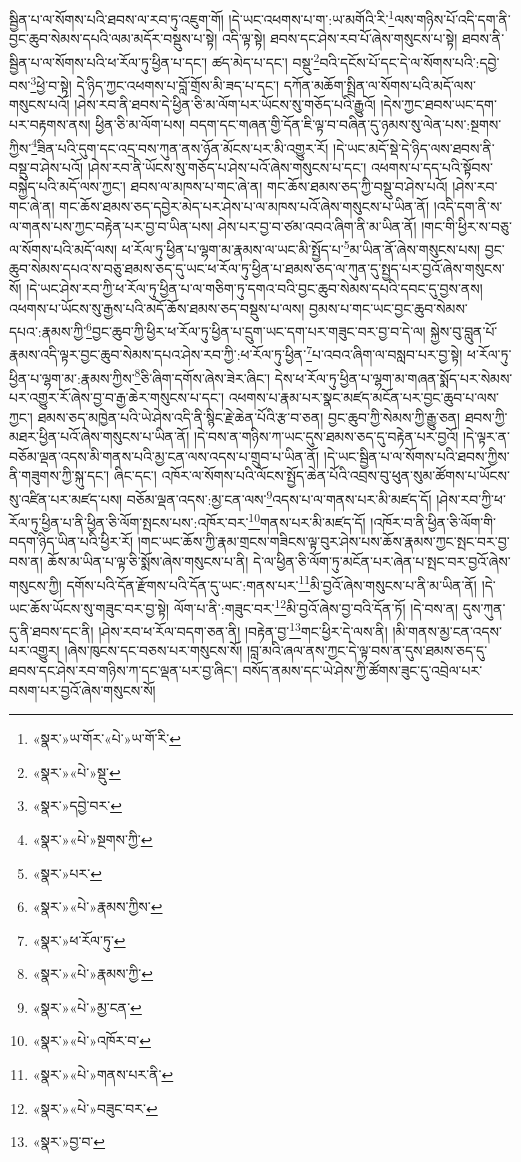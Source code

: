 སྦྱིན་པ་ལ་སོགས་པའི་ཐབས་ལ་རབ་ཏུ་འཇུག་གོ། །དེ་ཡང་འཕགས་པ་ག་:ཡ་མགོའི་རི་\footnote{«སྣར་»ཡ་གོར་«པེ་»ཡ་གོ་རི་}ལས་གཉིས་པོ་འདི་དག་ནི་བྱང་ཆུབ་སེམས་དཔའི་ལམ་མདོར་བསྡུས་པ་སྟེ། འདི་ལྟ་སྟེ། ཐབས་དང་ཤེས་རབ་པོ་ཞེས་གསུངས་པ་སྟེ། ཐབས་ནི་སྦྱིན་པ་ལ་སོགས་པའི་ཕ་རོལ་ཏུ་ཕྱིན་པ་དང་། ཚད་མེད་པ་དང་། བསྡུ་\footnote{«སྣར་»«པེ་»སྡུ་}བའི་དངོས་པོ་དང་དེ་ལ་སོགས་པའི་:དབྱེ་བས་\footnote{«སྣར་»དབྱེ་བར་}ཕྱེ་བ་སྟེ། དེ་ཉིད་ཀྱང་འཕགས་པ་བློ་གྲོས་མི་ཟད་པ་དང་། དཀོན་མཆོག་སྤྲིན་ལ་སོགས་པའི་མདོ་ལས་གསུངས་པའོ། །ཤེས་རབ་ནི་ཐབས་དེ་ཕྱིན་ཅི་མ་ལོག་པར་ཡོངས་སུ་གཅོད་པའི་རྒྱུའོ། །དེས་ཀྱང་ཐབས་ཡང་དག་པར་བརྟགས་ནས། ཕྱིན་ཅི་མ་ལོག་པས། བདག་དང་གཞན་གྱི་དོན་ཇི་ལྟ་བ་བཞིན་དུ་ཉམས་སུ་ལེན་པས་:སྔགས་ཀྱིས་\footnote{«སྣར་»«པེ་»སྔགས་ཀྱི་}ཟིན་པའི་དུག་དང་འདྲ་བས་ཀུན་ནས་ཉོན་མོངས་པར་མི་འགྱུར་རོ། །དེ་ཡང་མདོ་སྡེ་དེ་ཉིད་ལས་ཐབས་ནི་བསྡུ་བ་ཤེས་པའོ། །ཤེས་རབ་ནི་ཡོངས་སུ་གཅོད་པ་ཤེས་པའོ་ཞེས་གསུངས་པ་དང་། འཕགས་པ་དད་པའི་སྟོབས་བསྐྱེད་པའི་མདོ་ལས་ཀྱང་། ཐབས་ལ་མཁས་པ་གང་ཞེ་ན། གང་ཆོས་ཐམས་ཅད་ཀྱི་བསྡུ་བ་ཤེས་པའོ། །ཤེས་རབ་གང་ཞེ་ན། གང་ཆོས་ཐམས་ཅད་དབྱེར་མེད་པར་ཤེས་པ་ལ་མཁས་པའོ་ཞེས་གསུངས་པ་ཡིན་ནོ། །འདི་དག་ནི་ས་ལ་གནས་པས་ཀྱང་བརྟེན་པར་བྱ་བ་ཡིན་པས། ཤེས་པར་བྱ་བ་ཙམ་འབའ་ཞིག་ནི་མ་ཡིན་ནོ། །གང་གི་ཕྱིར་ས་བཅུ་ལ་སོགས་པའི་མདོ་ལས། ཕ་རོལ་ཏུ་ཕྱིན་པ་ལྷག་མ་རྣམས་ལ་ཡང་མི་སྤྱོད་པ་\footnote{«སྣར་»པར་}མ་ཡིན་ནོ་ཞེས་གསུངས་པས། བྱང་ཆུབ་སེམས་དཔའ་ས་བཅུ་ཐམས་ཅད་དུ་ཡང་ཕ་རོལ་ཏུ་ཕྱིན་པ་ཐམས་ཅད་ལ་ཀུན་དུ་སྤྱད་པར་བྱའོ་ཞེས་གསུངས་སོ། །དེ་ཡང་ཤེས་རབ་ཀྱི་ཕ་རོལ་ཏུ་ཕྱིན་པ་ལ་གཅིག་ཏུ་དགའ་བའི་བྱང་ཆུབ་སེམས་དཔའི་དབང་དུ་བྱས་ནས། འཕགས་པ་ཡོངས་སུ་རྒྱས་པའི་མདོ་ཆོས་ཐམས་ཅད་བསྡུས་པ་ལས། བྱམས་པ་གང་ཡང་བྱང་ཆུབ་སེམས་དཔའ་:རྣམས་ཀྱི་\footnote{«སྣར་»«པེ་»རྣམས་ཀྱིས་}བྱང་ཆུབ་ཀྱི་ཕྱིར་ཕ་རོལ་ཏུ་ཕྱིན་པ་དྲུག་ཡང་དག་པར་གཟུང་བར་བྱ་བ་དེ་ལ། སྐྱེས་བུ་བླུན་པོ་རྣམས་འདི་ལྟར་བྱང་ཆུབ་སེམས་དཔའ་ཤེས་རབ་ཀྱི་:ཕ་རོལ་ཏུ་ཕྱིན་\footnote{«སྣར་»ཕ་རོལ་ཏུ་}པ་འབའ་ཞིག་ལ་བསླབ་པར་བྱ་སྟེ། ཕ་རོལ་ཏུ་ཕྱིན་པ་ལྷག་མ་:རྣམས་ཀྱིས་\footnote{«སྣར་»«པེ་»རྣམས་ཀྱི་}ཅི་ཞིག་དགོས་ཞེས་ཟེར་ཞིང་། དེས་ཕ་རོལ་ཏུ་ཕྱིན་པ་ལྷག་མ་གཞན་སྨོད་པར་སེམས་པར་འགྱུར་རོ་ཞེས་བྱ་བ་རྒྱ་ཆེར་གསུངས་པ་དང་། འཕགས་པ་རྣམ་པར་སྣང་མཛད་མངོན་པར་བྱང་ཆུབ་པ་ལས་ཀྱང་། ཐམས་ཅད་མཁྱེན་པའི་ཡེ་ཤེས་འདི་ནི་སྙིང་རྗེ་ཆེན་པོའི་རྩ་བ་ཅན། བྱང་ཆུབ་ཀྱི་སེམས་ཀྱི་རྒྱུ་ཅན། ཐབས་ཀྱི་མཐར་ཕྱིན་པའོ་ཞེས་གསུངས་པ་ཡིན་ནོ། །དེ་བས་ན་གཉིས་ཀ་ཡང་དུས་ཐམས་ཅད་དུ་བརྟེན་པར་བྱའོ། །དེ་ལྟར་ན་བཅོམ་ལྡན་འདས་མི་གནས་པའི་མྱ་ངན་ལས་འདས་པ་གྲུབ་པ་ཡིན་ནོ། །དེ་ཡང་སྦྱིན་པ་ལ་སོགས་པའི་ཐབས་ཀྱིས་ནི་གཟུགས་ཀྱི་སྐུ་དང་། ཞིང་དང་། འཁོར་ལ་སོགས་པའི་ལོངས་སྤྱོད་ཆེན་པོའི་འབྲས་བུ་ཕུན་སུམ་ཚོགས་པ་ཡོངས་སུ་འཛིན་པར་མཛད་པས། བཅོམ་ལྡན་འདས་:མྱ་ངན་ལས་\footnote{«སྣར་»«པེ་»མྱ་ངན་}འདས་པ་ལ་གནས་པར་མི་མཛད་དོ། །ཤེས་རབ་ཀྱི་ཕ་རོལ་ཏུ་ཕྱིན་པ་ནི་ཕྱིན་ཅི་ལོག་སྤངས་པས་:འཁོར་བར་\footnote{«སྣར་»«པེ་»འཁོར་བ་}གནས་པར་མི་མཛད་དོ། །འཁོར་བ་ནི་ཕྱིན་ཅི་ལོག་གི་བདག་ཉིད་ཡིན་པའི་ཕྱིར་རོ། །གང་ཡང་ཆོས་ཀྱི་རྣམ་གྲངས་གཟིངས་ལྟ་བུར་ཤེས་པས་ཆོས་རྣམས་ཀྱང་སྤང་བར་བྱ་བས་ན། ཆོས་མ་ཡིན་པ་ལྟ་ཅི་སྨོས་ཞེས་གསུངས་པ་ནི། དེ་ལ་ཕྱིན་ཅི་ལོག་ཏུ་མངོན་པར་ཞེན་པ་སྤང་བར་བྱའོ་ཞེས་གསུངས་ཀྱི། དགོས་པའི་དོན་རྫོགས་པའི་དོན་དུ་ཡང་:གནས་པར་\footnote{«སྣར་»«པེ་»གནས་པར་ནི་}མི་བྱའོ་ཞེས་གསུངས་པ་ནི་མ་ཡིན་ནོ། །དེ་ཡང་ཆོས་ཡོངས་སུ་གཟུང་བར་བྱ་སྟེ། ལོག་པ་ནི་:གཟུང་བར་\footnote{«སྣར་»«པེ་»བཟུང་བར་}མི་བྱའོ་ཞེས་བྱ་བའི་དོན་ཏོ། །དེ་བས་ན། དུས་ཀུན་དུ་ནི་ཐབས་དང་ནི། །ཤེས་རབ་ཕ་རོལ་བདག་ཅན་ནི། །བརྟེན་བྱ་\footnote{«སྣར་»བྱ་བ་}གང་ཕྱིར་དེ་ལས་ནི། །མི་གནས་མྱ་ངན་འདས་པར་འགྱུར། །ཞེས་ཁུངས་དང་བཅས་པར་གསུངས་སོ། །བླ་མའི་ཞལ་ནས་ཀྱང་དེ་ལྟ་བས་ན་དུས་ཐམས་ཅད་དུ་ཐབས་དང་ཤེས་རབ་གཉིས་ཀ་དང་ལྡན་པར་བྱ་ཞིང་། བསོད་ནམས་དང་ཡེ་ཤེས་ཀྱི་ཚོགས་ཟུང་དུ་འབྲེལ་པར་བསག་པར་བྱའོ་ཞེས་གསུངས་སོ། 